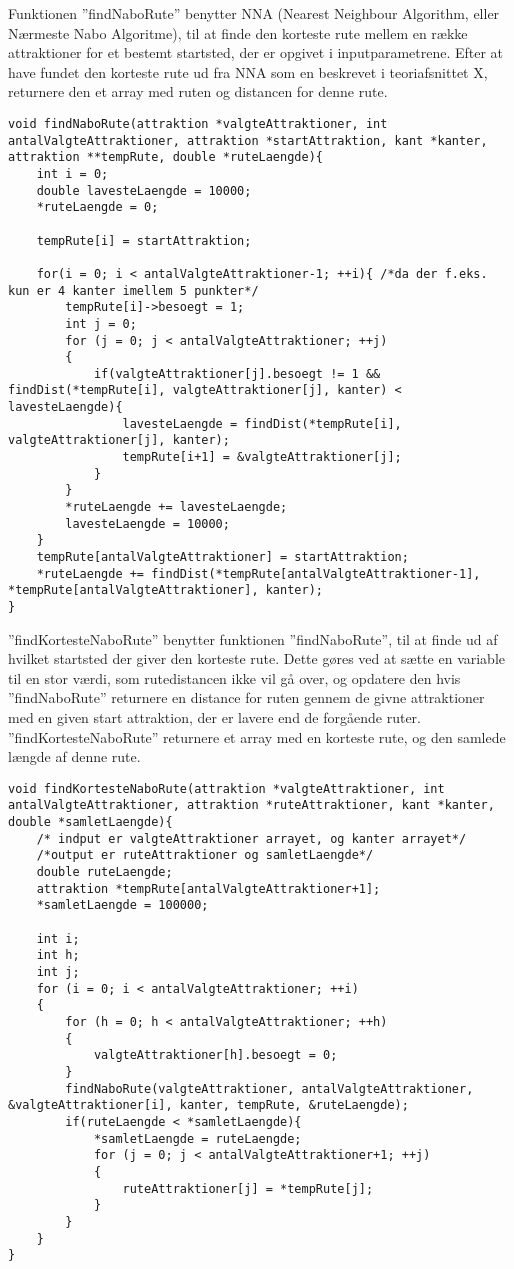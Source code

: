 Funktionen ”findNaboRute” benytter NNA (Nearest Neighbour Algorithm, eller Nærmeste Nabo Algoritme), til at finde den korteste rute mellem en række attraktioner for et bestemt startsted, der er opgivet i inputparametrene. Efter at have fundet den korteste rute ud fra NNA som en beskrevet i teoriafsnittet X, returnere den et array med ruten og distancen for denne rute. 

\begin{lstlisting}
void findNaboRute(attraktion *valgteAttraktioner, int antalValgteAttraktioner, attraktion *startAttraktion, kant *kanter, attraktion **tempRute, double *ruteLaengde){
	int i = 0;
	double lavesteLaengde = 10000;
	*ruteLaengde = 0;

	tempRute[i] = startAttraktion;

	for(i = 0; i < antalValgteAttraktioner-1; ++i){ /*da der f.eks. kun er 4 kanter imellem 5 punkter*/
		tempRute[i]->besoegt = 1;
		int j = 0;
		for (j = 0; j < antalValgteAttraktioner; ++j)
		{
			if(valgteAttraktioner[j].besoegt != 1 && findDist(*tempRute[i], valgteAttraktioner[j], kanter) < lavesteLaengde){
				lavesteLaengde = findDist(*tempRute[i], valgteAttraktioner[j], kanter);
				tempRute[i+1] = &valgteAttraktioner[j];
			}
		}
		*ruteLaengde += lavesteLaengde;
		lavesteLaengde = 10000;
	}
	tempRute[antalValgteAttraktioner] = startAttraktion;
	*ruteLaengde += findDist(*tempRute[antalValgteAttraktioner-1], *tempRute[antalValgteAttraktioner], kanter);
}
\end{lstlisting}

”findKortesteNaboRute” benytter funktionen ”findNaboRute”, til at finde ud af hvilket startsted der giver den korteste rute. Dette gøres ved at sætte en variable til en stor værdi, som rutedistancen ikke vil gå over, og opdatere den hvis ”findNaboRute” returnere en distance for ruten gennem de givne attraktioner med en given start attraktion, der er lavere end de forgående ruter. ”findKortesteNaboRute” returnere et array med en korteste rute, og den samlede længde af denne rute. 

\begin{lstlisting}
void findKortesteNaboRute(attraktion *valgteAttraktioner, int antalValgteAttraktioner, attraktion *ruteAttraktioner, kant *kanter, double *samletLaengde){
	/* indput er valgteAttraktioner arrayet, og kanter arrayet*/
	/*output er ruteAttraktioner og samletLaengde*/
	double ruteLaengde;
	attraktion *tempRute[antalValgteAttraktioner+1];
	*samletLaengde = 100000;
	
	int i;
	int h;
	int j;
	for (i = 0; i < antalValgteAttraktioner; ++i)
	{
		for (h = 0; h < antalValgteAttraktioner; ++h)
		{
			valgteAttraktioner[h].besoegt = 0;
		}
		findNaboRute(valgteAttraktioner, antalValgteAttraktioner, &valgteAttraktioner[i], kanter, tempRute, &ruteLaengde);
		if(ruteLaengde < *samletLaengde){
			*samletLaengde = ruteLaengde;
			for (j = 0; j < antalValgteAttraktioner+1; ++j)
			{
				ruteAttraktioner[j] = *tempRute[j];
			}
		}
	}
}
\end{lstlisting}

